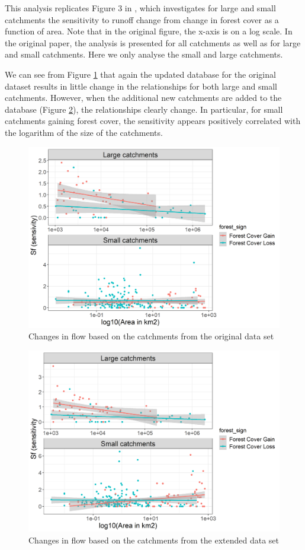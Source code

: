 \documentclass[]{elsarticle} %
\begin{document}
This analysis replicates Figure 3 in \citet{zhang2017}, which investigates for large and small catchments the sensitivity to runoff change from change in forest cover as a function of area. Note that in the original figure, the x-axis is on a log scale. In the original paper, the analysis is presented for all catchments as well as for large and small catchments. Here we only analyse the small and large catchments.

We can see from Figure \ref{fig:Fig3Zhang} that again the updated database for the original dataset results in little change in the relationships for both large and small catchments. However, when the additional new catchments are added to the database (Figure \ref{fig:Fig3Zhangnew}), the relationships clearly change. In particular, for small catchments gaining forest cover, the sensitivity appears positively correlated with the logarithm of the size of the catchments.

\begin{figure}
\includegraphics[width=0.9\linewidth]{Fig3Zhang} \caption{Changes in flow based on the catchments from the original data set}\label{fig:Fig3Zhang}
\end{figure}

\begin{figure}
\includegraphics[width=0.9\linewidth]{Fig3Zhang_all} \caption{Changes in flow based on the catchments from the extended data set}\label{fig:Fig3Zhangnew}
\end{figure}
\end{document}
